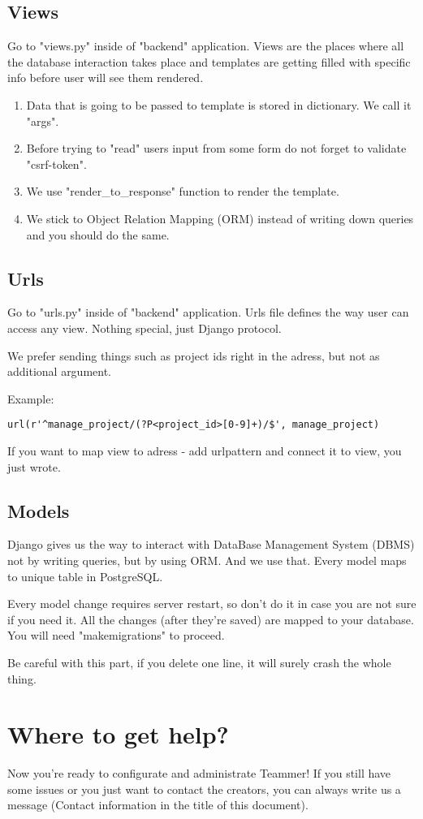 \documentclass{report}
\begin{document}
\subsection{Views}
Go to "views.py" inside of "backend" application. Views are the places where all the database interaction takes place and templates are getting filled with specific info before user will see them rendered.
\begin{enumerate}
\item Data that is going to be passed to template is stored in dictionary. We call it "args".
\item Before trying to "read" users input from some form do not forget to validate "csrf-token".
\item We use "render\_to\_response" function to render the template.
\item We stick to Object Relation Mapping (ORM) instead of writing down queries and you should do the same.
\end{enumerate}

\subsection{Urls}
Go to "urls.py" inside of "backend" application. Urls file defines the way user can access any view. Nothing special, just Django protocol.

We prefer sending things such as project ids right in the adress, but not as additional argument.

Example:
\begin{lstlisting}[frame=single]
url(r'^manage_project/(?P<project_id>[0-9]+)/$', manage_project)
\end{lstlisting}

If you want to map view to adress - add urlpattern and connect it to view, you just wrote.

\subsection{Models}
Django gives us the way to interact with DataBase Management System (DBMS) not by writing queries, but by using ORM.
And we use that. Every model maps to unique table in PostgreSQL.

Every model change requires server restart, so don’t do it in case you are not sure if you need it. All the changes (after they’re saved) are mapped to your database. You will need "makemigrations" to proceed.

Be careful with this part, if you delete one line, it will surely crash the whole thing.

\section{Where to get help?}

Now you’re ready to configurate and administrate Teammer! If you still have some issues or you just want to contact the creators, you can always write us a message (Contact information in the title of this document).
\end{document}
